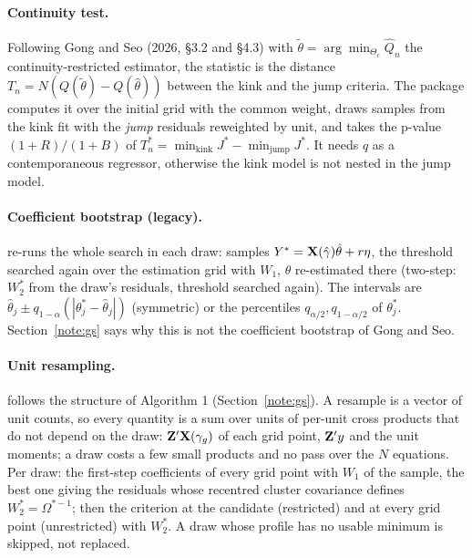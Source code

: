 \paragraph{Continuity test.} Following Gong and Seo (2026, \S3.2 and \S4.3) with
$\tilde\theta=\arg\min_{\Theta_c}\hat Q_n$ the continuity-restricted estimator, the statistic is the
distance $T_n=N(Q(\tilde\theta)-Q(\hat\theta))$ between the kink and the jump criteria. The package computes
it over the initial grid with the common weight, draws samples from the kink fit with the \emph{jump}
residuals reweighted by unit, and takes the p-value $(1+R)/(1+B)$ of $T^*_n=\min_{\text{kink}}J^*-\min_{\text{jump}}J^*$.
It needs $q$ as a contemporaneous regressor, otherwise the kink model is not nested in the jump model.

\paragraph{Coefficient bootstrap (legacy).}  re-runs the whole search in each draw: samples
$Y^*=\mathbf{X}(\hat\gamma)\hat\theta+r\eta$, the threshold searched again over the estimation grid with $W_1$, $\theta$
re-estimated there (two-step: $W_2^*$ from the draw's residuals, threshold searched again). The intervals are
$\hat\theta_j\pm q_{1-\alpha}(|\theta^*_j-\hat\theta_j|)$ (symmetric) or the percentiles
$q_{\alpha/2},q_{1-\alpha/2}$ of $\theta^*_j$. Section~\ref{note:gs} says why this is not the coefficient
bootstrap of Gong and Seo.

\paragraph{Unit resampling.}  follows the structure of Algorithm 1
(Section~\ref{note:gs}). A resample is a vector of unit counts, so every quantity is a sum over units of
per-unit cross products that do not depend on the draw: $\mathbf{Z}'\mathbf{X}(\gamma_g)$ of each grid point, $\mathbf{Z}'y$ and the
unit moments; a draw costs a few small products and no pass over the $N$ equations. Per draw: the
first-step coefficients of every grid point with $W_1$ of the sample, the best one giving the residuals whose
recentred cluster covariance defines $W_2^*=\Omega^{*-1}$; then the criterion at the candidate (restricted)
and at every grid point (unrestricted) with $W_2^*$. A draw whose profile has no usable minimum is skipped,
not replaced.

